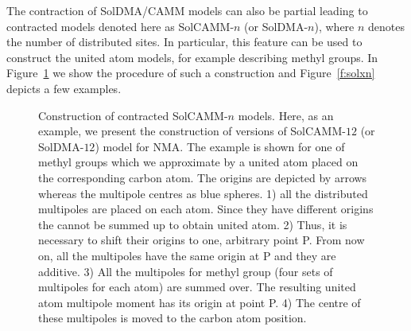 \documentclass[b5paper,oneside,fleqn,11pt]{book}
\begin{document}
\begin{refsection}
The contraction of SolDMA/CAMM models can also be partial
leading to contracted models denoted here as SolCAMM-$n$ (or SolDMA-$n$), where
$n$ denotes the number of distributed sites. In particular,
this feature can be used to construct the united atom models,
for example describing methyl groups. In Figure~\ref{f:contr}
we show the procedure of such a construction and Figure~\ref{f:solxn}
depicts a few examples.
%
\begin{figure}[!ht]
\centering
\setlength\fboxsep{0.4pt}
\setlength\fboxrule{0.5pt}
\caption{Construction of contracted SolCAMM-$n$ models. Here, as an example, we present
the construction of versions of SolCAMM-$12$ (or SolDMA-$12$) model for NMA. 
The example is shown for one of methyl groups which we approximate by a united atom 
placed on the corresponding carbon atom. The origins are depicted by arrows
whereas the multipole centres as blue spheres. 1) all the distributed multipoles 
are placed on each atom. Since they have different origins the cannot be summed up 
to obtain united atom. 2) Thus, it is necessary to shift their origins to one, 
arbitrary point P. From now on, all the multipoles have the same origin at P 
and they are additive. 3) All the multipoles for methyl group (four sets 
of multipoles for each atom) are summed over. The resulting united atom 
multipole moment has its origin at point P. 4) The centre of these multipoles 
is moved to the carbon atom position.
\label{f:contr}}
\end{figure}
%


\end{refsection}
\end{document}

